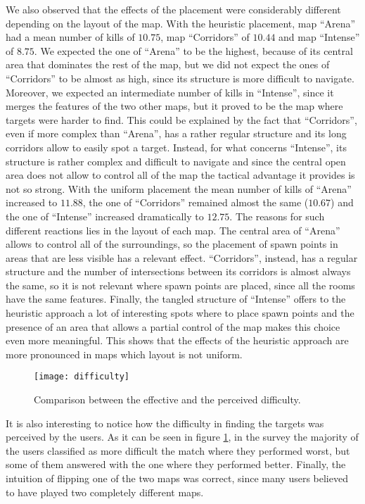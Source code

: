 \par

We also observed that the effects of the placement were considerably different depending on the layout of the map. With the heuristic placement, map ``Arena'' had a mean number of kills of $10.75$, map ``Corridors'' of $10.44$ and map ``Intense'' of $8.75$. We expected the one of ``Arena'' to be the highest, because of its central area that dominates the rest of the map, but we did not expect the ones of ``Corridors'' to be almost as high, since its structure is more difficult to navigate. Moreover, we expected an intermediate number of kills in ``Intense'', since it merges the features of the two other maps, but it proved to be the map where targets were harder to find. This could be explained by the fact that ``Corridors'', even if more complex than ``Arena'', has a rather regular structure and its long corridors allow to easily spot a target. Instead, for what concerns ``Intense'', its structure is rather complex and difficult to navigate and since the central open area does not allow to control all of the map the tactical advantage it provides is not so strong. With the uniform placement the mean number of kills of ``Arena'' increased to $11.88$, the one of ``Corridors'' remained almost the same ($10.67$) and the one of ``Intense'' increased dramatically to $12.75$. The reasons for such different reactions lies in the layout of each map. The central area of ``Arena'' allows to control all of the surroundings, so the placement of spawn points in areas that are less visible has a relevant effect. ``Corridors'', instead, has a regular structure and the number of intersections between its corridors is almost always the same, so it is not relevant where spawn points are placed, since all the rooms have the same features. Finally, the tangled structure of ``Intense'' offers to the heuristic approach a lot of interesting spots where to place spawn points and the presence of an area that allows a partial control of the map makes this choice even more meaningful. This shows that the effects of the heuristic approach are more pronounced in maps which layout is not uniform.

\begin{figure}
\centering
\texttt{[image: difficulty]}
\caption{Comparison between the effective and the perceived difficulty.}
\label{img:percived} 
\end{figure}

It is also interesting to notice how the difficulty in finding the targets was perceived by the users. As it can be seen in figure \ref{img:percived}, in the survey the majority of the users classified as more difficult the match where they performed worst, but some of them answered with the one where they performed better. Finally, the intuition of flipping one of the two maps was correct, since many users believed to have played two completely different maps. 

